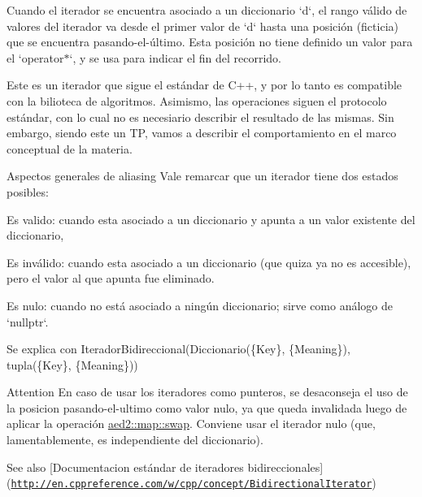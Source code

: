 \-Cuando el iterador se encuentra asociado a un diccionario `d`, el rango válido de valores del iterador va desde el primer valor de `d` hasta una posición (ficticia) que se encuentra pasando-\/el-\/último. \-Esta posición no tiene definido un valor para el `operator$\ast$`, y se usa para indicar el fin del recorrido.

\-Este es un iterador que sigue el estándar de \-C++, y por lo tanto es compatible con la bilioteca de algoritmos. \-Asimismo, las operaciones siguen el protocolo estándar, con lo cual no es necesiario describir el resultado de las mismas. \-Sin embargo, siendo este un \-T\-P, vamos a describir el comportamiento en el marco conceptual de la materia.

\begin{DoxyParagraph}{\-Aspectos generales de aliasing}
\-Vale remarcar que un iterador tiene dos estados posibles\-:
\begin{DoxyEnumerate}
\item \-Es valido\-: cuando esta asociado a un diccionario y apunta a un valor existente del diccionario,
\item \-Es inválido\-: cuando esta asociado a un diccionario (que quiza ya no es accesible), pero el valor al que apunta fue eliminado.
\item \-Es nulo\-: cuando no está asociado a ningún diccionario; sirve como análogo de `nullptr`. 
\end{DoxyEnumerate}
\end{DoxyParagraph}
\begin{DoxyParagraph}{\-Se explica con}
\-Iterador\-Bidireccional(\-Diccionario(\{\-Key\}, \{\-Meaning\}), tupla(\{\-Key\}, \{\-Meaning\}))
\end{DoxyParagraph}
\begin{DoxyAttention}{\-Attention}
\-En caso de usar los iteradores como punteros, se desaconseja el uso de la posicion pasando-\/el-\/ultimo como valor nulo, ya que queda invalidada luego de aplicar la operación \hyperlink{classaed2_1_1map_a43ddb71cc91e5c6021a7a1f243d6cc4a}{aed2\-::map\-::swap}. \-Conviene usar el iterador nulo (que, lamentablemente, es independiente del diccionario).
\end{DoxyAttention}
\begin{DoxySeeAlso}{\-See also}
\mbox{[}\-Documentacion estándar de iteradores bidireccionales\mbox{]}(\href{http://en.cppreference.com/w/cpp/concept/BidirectionalIterator}{\tt http\-://en.\-cppreference.\-com/w/cpp/concept/\-Bidirectional\-Iterator}) 
\end{DoxySeeAlso}


